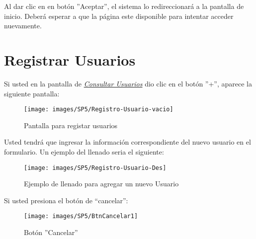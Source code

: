             
            Al dar clic en en botón ''Aceptar'', el sistema  lo redireccionará  a la pantalla de inicio. Deberá esperar a que la página este disponible para intentar acceder nuevamente.
        

    \newpage
        
        \section{Registrar Usuarios} 
            Si usted  en la pantalla de \hyperlink{consultarUs}{\textit{Consultar Usuarios}} dio clic en el botón ''+'', aparece la siguiente pantalla:
            
            \begin{figure}[!hbtp]
                \centering
                \hypertarget{registrarUs}{\texttt{[image: images/SP5/Registro-Usuario-vacio]}}
                \caption{Pantalla para registar usuarios}
                \label{registrarrh}
            \end{figure}
            
            Usted tendrá que ingresar la información correspondiente del nuevo usuario en el formulario. Un ejemplo del llenado seria el siguiente:
        
            \begin{figure}[!hbtp]
                \centering
                \hypertarget{ejreg}{\texttt{[image: images/SP5/Registro-Usuario-Des]}}
                \caption{Ejemplo de llenado para agregar un nuevo Usuario}
                \label{ejreg}
            \end{figure}
    
    \newpage
            Si usted presiona el botón de “cancelar”: 
            
            \begin{figure}[!hbtp]
                \centering
                \hypertarget{cancel1}{\texttt{[image: images/SP5/BtnCancelar1]}}
                \caption{Botón ''Cancelar''}
                \label{cancel1}
            \end{figure}
            
